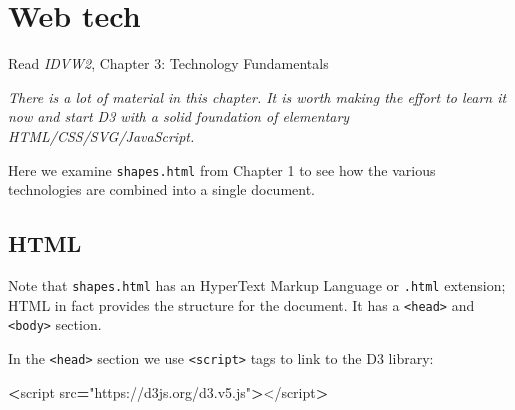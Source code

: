 \documentclass[openany]{book}
\newenvironment{Shaded}{\begin{snugshade}}{\end{snugshade}}
\newcommand{\AttributeTok}[1]{\textcolor[rgb]{0.77,0.63,0.00}{#1}}
\newcommand{\KeywordTok}[1]{\textcolor[rgb]{0.13,0.29,0.53}{\textbf{#1}}}
\newcommand{\NormalTok}[1]{#1}
\newcommand{\OperatorTok}[1]{\textcolor[rgb]{0.81,0.36,0.00}{\textbf{#1}}}
\newcommand{\SpecialCharTok}[1]{\textcolor[rgb]{0.00,0.00,0.00}{#1}}
\newcommand{\StringTok}[1]{\textcolor[rgb]{0.31,0.60,0.02}{#1}}
\newcommand{\VariableTok}[1]{\textcolor[rgb]{0.00,0.00,0.00}{#1}}
\newcommand{\VerbatimStringTok}[1]{\textcolor[rgb]{0.31,0.60,0.02}{#1}}
\begin{document}
\begin{enumerate}
\begin{Shaded}
\end{Shaded}
\end{enumerate}

\hypertarget{web}{%
\chapter{Web tech }\label{web}}

Read \emph{IDVW2}, Chapter 3: Technology Fundamentals

\emph{There is a lot of material in this chapter. It is worth making the effort to learn it now and start D3 with a solid foundation of elementary HTML/CSS/SVG/JavaScript.}

Here we examine \texttt{shapes.html} from Chapter 1 to see how the various technologies are combined into a single document.

\hypertarget{html}{%
\section{HTML }\label{html}}

Note that \texttt{shapes.html} has an HyperText Markup Language or \texttt{.html} extension; HTML in fact provides the structure for the document. It has a \texttt{\textless{}head\textgreater{}} and \texttt{\textless{}body\textgreater{}} section.

In the \texttt{\textless{}head\textgreater{}} section we use \texttt{\textless{}script\textgreater{}} tags to link to the D3 library:

\begin{Shaded}
\begin{Highlighting}[]
\OperatorTok{<}\NormalTok{script src}\OperatorTok{=}\StringTok{"https://d3js.org/d3.v5.js"}\OperatorTok{>}\NormalTok{</script}\OperatorTok{>}
\end{Highlighting}
\end{Shaded}
\end{document}
